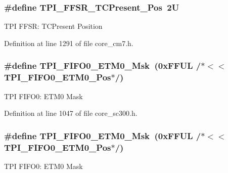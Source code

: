 \subsubsection[{\texorpdfstring{T\+P\+I\+\_\+\+F\+F\+S\+R\+\_\+\+T\+C\+Present\+\_\+\+Pos}{TPI_FFSR_TCPresent_Pos}}]{\setlength{\rightskip}{0pt plus 5cm}\#define T\+P\+I\+\_\+\+F\+F\+S\+R\+\_\+\+T\+C\+Present\+\_\+\+Pos~2U}\hypertarget{group___c_m_s_i_s___t_p_i_gad30fde0c058da2ffb2b0a213be7a1b5c}{}\label{group___c_m_s_i_s___t_p_i_gad30fde0c058da2ffb2b0a213be7a1b5c}
T\+PI F\+F\+SR\+: T\+C\+Present Position 

Definition at line 1291 of file core\+\_\+cm7.\+h.

\subsubsection[{\texorpdfstring{T\+P\+I\+\_\+\+F\+I\+F\+O0\+\_\+\+E\+T\+M0\+\_\+\+Msk}{TPI_FIFO0_ETM0_Msk}}]{\setlength{\rightskip}{0pt plus 5cm}\#define T\+P\+I\+\_\+\+F\+I\+F\+O0\+\_\+\+E\+T\+M0\+\_\+\+Msk~(0x\+F\+F\+U\+L /$\ast$$<$$<$ T\+P\+I\+\_\+\+F\+I\+F\+O0\+\_\+\+E\+T\+M0\+\_\+\+Pos$\ast$/)}\hypertarget{group___c_m_s_i_s___t_p_i_gaf924f7d1662f3f6c1da12052390cb118}{}\label{group___c_m_s_i_s___t_p_i_gaf924f7d1662f3f6c1da12052390cb118}
T\+PI F\+I\+F\+O0\+: E\+T\+M0 Mask 

Definition at line 1047 of file core\+\_\+sc300.\+h.

\subsubsection[{\texorpdfstring{T\+P\+I\+\_\+\+F\+I\+F\+O0\+\_\+\+E\+T\+M0\+\_\+\+Msk}{TPI_FIFO0_ETM0_Msk}}]{\setlength{\rightskip}{0pt plus 5cm}\#define T\+P\+I\+\_\+\+F\+I\+F\+O0\+\_\+\+E\+T\+M0\+\_\+\+Msk~(0x\+F\+F\+U\+L /$\ast$$<$$<$ T\+P\+I\+\_\+\+F\+I\+F\+O0\+\_\+\+E\+T\+M0\+\_\+\+Pos$\ast$/)}\hypertarget{group___c_m_s_i_s___t_p_i_gaf924f7d1662f3f6c1da12052390cb118}{}\label{group___c_m_s_i_s___t_p_i_gaf924f7d1662f3f6c1da12052390cb118}
T\+PI F\+I\+F\+O0\+: E\+T\+M0 Mask 

